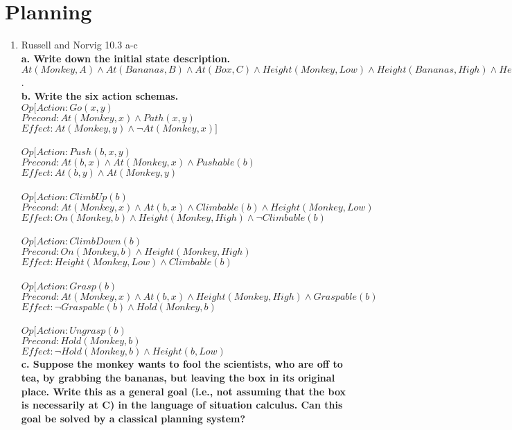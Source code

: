 \documentclass[12pt]{article}
\begin{document}
\section{Planning}
\begin{enumerate}
\item Russell and Norvig 10.3 a-c\\
\textbf{a. Write down the initial state description.} \\
$At(Monkey, A)\wedge At(Bananas, B)\wedge At(Box, C)\wedge Height(Monkey, Low)\wedge Height(Bananas, High)\wedge Height(Box, Low)\wedge Pushable(Box)\wedge Climbable(Box)\wedge Graspable(Bananas)$. \\
\textbf{b. Write the six action schemas.} \\
$Op[Action: Go(x, y)$\\
$Precond: At(Monkey, x)\wedge Path(x, y)$\\
$Effect: At(Monkey, y)\wedge\neg At(Monkey, x)]$\\
\\
$Op[Action: Push(b, x, y)$\\
$Precond: At(b, x)\wedge At(Monkey, x)\wedge Pushable(b)$\\
$Effect: At(b, y)\wedge At(Monkey, y)$\\
\\
$Op[Action: ClimbUp(b)$\\
$Precond: At(Monkey, x)\wedge At(b, x)\wedge Climbable(b)\wedge Height(Monkey, Low)$\\
$Effect: On(Monkey, b)\wedge Height(Monkey, High)\wedge\neg Climbable(b)$\\
\\
$Op[Action: ClimbDown(b)$\\
$Precond: On(Monkey, b)\wedge Height(Monkey, High)$\\
$Effect: Height(Monkey, Low)\wedge Climbable(b)$\\
\\
$Op[Action: Grasp(b)$\\
$Precond: At(Monkey, x)\wedge At(b, x)\wedge Height(Monkey, High)\wedge Graspable(b)$\\
$Effect: \neg Graspable(b)\wedge Hold(Monkey, b)$\\
\\
$Op[Action: Ungrasp(b)$\\
$Precond: Hold(Monkey, b)$\\
$Effect: \neg Hold(Monkey, b)\wedge Height(b, Low)$\\
\textbf{c. Suppose the monkey wants to fool the scientists, who are off to tea, by grabbing the bananas, but leaving the box in its original place. Write this as a general goal (i.e., not assuming that the box is necessarily at C) in the language of situation calculus. Can this goal be solved by a classical planning system?}\\

\end{enumerate}
\end{document}
